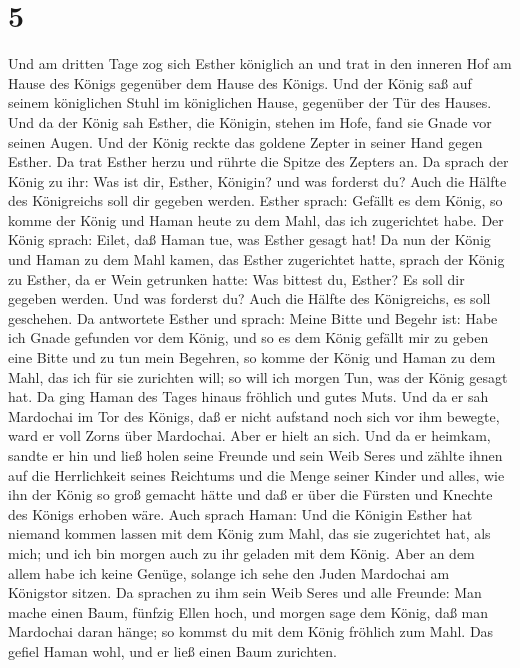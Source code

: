 \hypertarget{section-4}{%
\section{5}\label{section-4}}

 Und am dritten Tage zog sich Esther königlich an und trat
in den inneren Hof am Hause des Königs gegenüber dem Hause des Königs.
Und der König saß auf seinem königlichen Stuhl im königlichen Hause,
gegenüber der Tür des Hauses.  Und da der König sah Esther,
die Königin, stehen im Hofe, fand sie Gnade vor seinen Augen. Und der
König reckte das goldene Zepter in seiner Hand gegen Esther. Da trat
Esther herzu und rührte die Spitze des Zepters an.  Da
sprach der König zu ihr: Was ist dir, Esther, Königin? und was forderst
du? Auch die Hälfte des Königreichs soll dir gegeben werden.
 Esther sprach: Gefällt es dem König, so komme der König und
Haman heute zu dem Mahl, das ich zugerichtet habe.  Der
König sprach: Eilet, daß Haman tue, was Esther gesagt hat! Da nun der
König und Haman zu dem Mahl kamen, das Esther zugerichtet hatte,
 sprach der König zu Esther, da er Wein getrunken hatte: Was
bittest du, Esther? Es soll dir gegeben werden. Und was forderst du?
Auch die Hälfte des Königreichs, es soll geschehen.  Da
antwortete Esther und sprach: Meine Bitte und Begehr ist: 
Habe ich Gnade gefunden vor dem König, und so es dem König gefällt mir
zu geben eine Bitte und zu tun mein Begehren, so komme der König und
Haman zu dem Mahl, das ich für sie zurichten will; so will ich morgen
Tun, was der König gesagt hat.  Da ging Haman des Tages
hinaus fröhlich und gutes Muts. Und da er sah Mardochai im Tor des
Königs, daß er nicht aufstand noch sich vor ihm bewegte, ward er voll
Zorns über Mardochai.  Aber er hielt an sich. Und da er
heimkam, sandte er hin und ließ holen seine Freunde und sein Weib Seres
 und zählte ihnen auf die Herrlichkeit seines Reichtums und
die Menge seiner Kinder und alles, wie ihn der König so groß gemacht
hätte und daß er über die Fürsten und Knechte des Königs erhoben wäre.
 Auch sprach Haman: Und die Königin Esther hat niemand
kommen lassen mit dem König zum Mahl, das sie zugerichtet hat, als mich;
und ich bin morgen auch zu ihr geladen mit dem König.  Aber
an dem allem habe ich keine Genüge, solange ich sehe den Juden Mardochai
am Königstor sitzen.  Da sprachen zu ihm sein Weib Seres
und alle Freunde: Man mache einen Baum, fünfzig Ellen hoch, und morgen
sage dem König, daß man Mardochai daran hänge; so kommst du mit dem
König fröhlich zum Mahl. Das gefiel Haman wohl, und er ließ einen Baum
zurichten.

